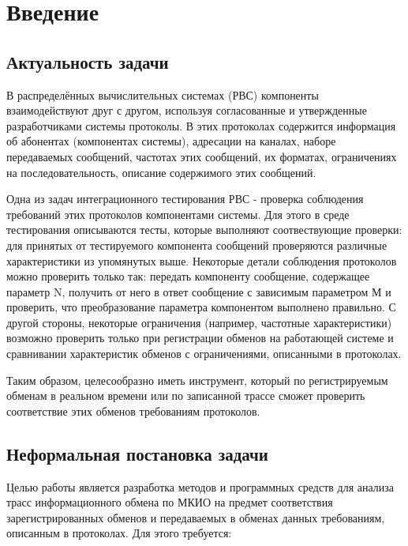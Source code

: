 \section{Введение}

\subsection{Актуальность задачи}


В распределённых вычислительных системах (РВС) компоненты взаимодействуют друг 
с другом, используя согласованные и утвержденные разработчиками системы 
протоколы. В этих протоколах содержится информация об абонентах (компонентах 
системы), адресации на каналах, наборе передаваемых сообщений, частотах этих 
сообщений, их форматах, ограничениях на последовательность, описание 
содержимого этих сообщений.

Одна из задач интеграционного тестирования РВС - проверка соблюдения требований 
этих протоколов компонентами системы. Для этого в среде тестирования 
описываются тесты, которые выполняют соотвествующие проверки: для принятых от 
тестируемого компонента сообщений проверяются различные характеристики из 
упомянутых выше. Некоторые детали соблюдения протоколов можно проверить только 
так: передать компоненту сообщение, содержащее параметр N, получить от него в 
ответ сообщение с зависимым параметром М и проверить, что преобразование 
параметра компонентом выполнено правильно. С другой стороны, некоторые 
ограничения (например, частотные характеристики) возможно проверить только при 
регистрации обменов на работающей системе и сравнивании характеристик обменов с 
ограничениями, описанными в протоколах.

Таким образом, целесообразно иметь инструмент, который по регистрируемым обменам 
в реальном времени или по записанной трассе сможет проверить соответствие этих 
обменов требованиям протоколов.

\subsection{Неформальная постановка задачи}

Целью работы является разработка методов и программных средств для анализа 
трасс информационного обмена по МКИО на предмет соответствия зарегистрированных 
обменов и передаваемых в обменах данных требованиям, описанным в протоколах. 
Для этого требуется:

